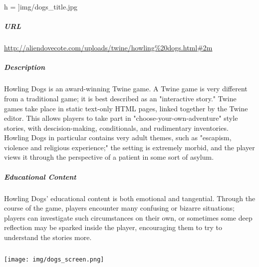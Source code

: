 h = \textwidth]{img/dogs_title.jpg}\subparagraph{URL}\url{http://aliendovecote.com/uploads/twine/howling%20dogs.html#2m}\subparagraph{Description}Howling Dogs is an award-winning Twine game. A Twine game is very different from a traditional game; it is best described as an "interactive story." Twine games take place in static text-only HTML pages, linked together by the Twine editor. This allows players to take part in "choose-your-own-adventure" style stories, with descision-making, conditionals, and rudimentary inventories. Howling Dogs in particular contains very adult themes, such as "escapism, violence and religious experience;" the setting is extremely morbid, and the player views it through the perspective of a patient in some sort of asylum.\subparagraph{Educational Content}Howling Dogs' educational content is both emotional and tangential. Through the course of the game, players encounter many confusing or bizarre situations; players can investigate such circumstances on their own, or sometimes some deep reflection may be sparked inside the player, encouraging them to try to understand the stories more.\subparagraph{}\texttt{[image: img/dogs\_screen.png]}